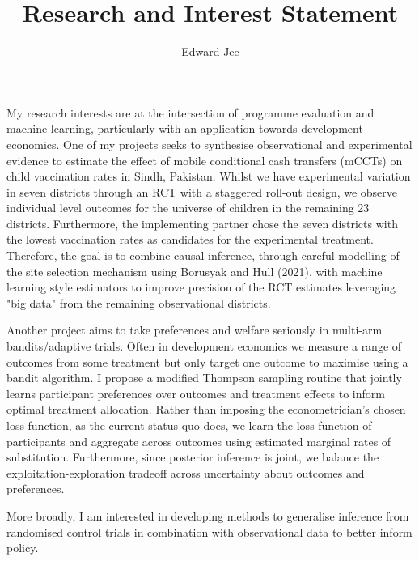 \documentclass{article}
\author{Edward Jee}
\title{Research and Interest Statement}
\begin{document}
\maketitle

My research interests are at the intersection of programme evaluation and machine 
learning, particularly with an application towards development economics. One 
of my projects seeks to synthesise observational and experimental evidence to 
estimate the effect of mobile conditional cash transfers (mCCTs) on 
child vaccination rates in Sindh, Pakistan. Whilst we have experimental variation 
in seven districts through an RCT with a staggered roll-out design, we observe 
individual level outcomes for 
the universe of children in the remaining 23 districts. Furthermore, the implementing 
partner chose the seven districts with the lowest vaccination rates as candidates 
for the experimental treatment. Therefore, the goal is to combine causal inference, 
through careful modelling of the site selection mechanism using Borusyak and Hull (2021), 
with machine learning style estimators to improve precision of the RCT estimates 
leveraging "big data" from the remaining observational districts.



Another project aims to take preferences and welfare seriously in multi-arm 
bandits/adaptive trials. Often in development economics we measure a range of 
outcomes from some treatment but only target one outcome to maximise using a 
bandit algorithm. I propose a modified Thompson sampling routine that jointly 
learns participant preferences over outcomes and treatment effects to inform optimal treatment 
allocation. Rather than imposing the econometrician's chosen loss function, as 
the current status quo does, we learn the loss function of participants and 
aggregate across outcomes using estimated marginal rates of substitution. Furthermore, 
since posterior inference is joint, we balance the exploitation-exploration 
tradeoff across uncertainty about outcomes and preferences.


More broadly, I am interested in developing methods to generalise inference from 
randomised control trials in combination with observational data to better inform 
policy. 



    
\end{document}
